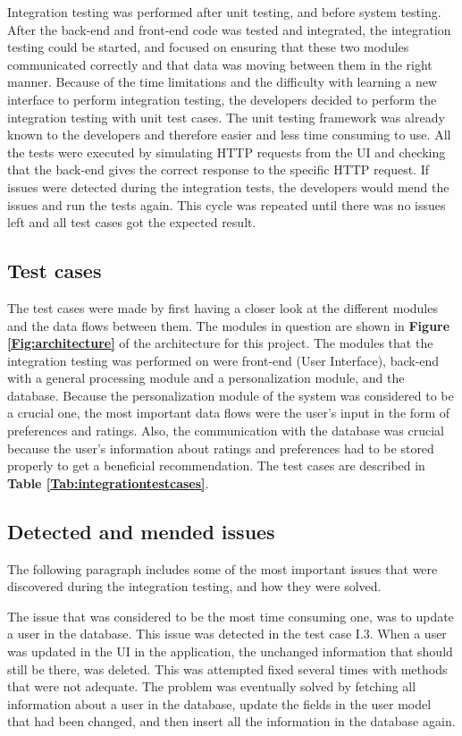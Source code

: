 Integration testing was performed after unit testing, and before system testing. After the back-end and front-end code was tested and integrated, the integration testing could be started, and focused on ensuring that these two modules communicated correctly and that data was moving between them in the right manner. 
Because of the time limitations and the difficulty with learning a new interface to perform integration testing, the developers decided to perform the integration testing with unit test cases. The unit testing framework was already known to the developers and therefore easier and less time consuming to use. All the tests were executed by simulating HTTP requests from the UI and checking that the back-end gives the correct response to the specific HTTP request. 
If issues were detected during the integration tests, the developers would mend the issues and run the tests again. This cycle was repeated until there was no issues left and all test cases got the expected result. \newline


\subsection{Test cases}
The test cases were made by first having a closer look at the different modules and the data flows between them. The modules in question are shown in \textbf{Figure \ref{Fig:architecture}} of the architecture for this project. The modules that the integration testing was performed on were front-end (User Interface), back-end with a general processing module and a personalization module, and the database. Because the personalization module of the system was considered to be a crucial one, the most important data flows were the user's input in the form of preferences and ratings. Also, the communication with the database was crucial because the user's information about ratings and preferences had to be stored properly to get a beneficial recommendation. The test cases are described in \textbf{Table \ref{Tab:integrationtestcases}}.


\subsection{Detected and mended issues}

The following paragraph includes some of the most important issues that were discovered during the integration testing, and how they were solved.

The issue that was considered to be the most time consuming one, was to update a user in the database. This issue was detected in the test case I.3. When a user was updated in the UI in the application, the unchanged information that should still be there, was deleted. This was attempted fixed several times with methods that were not adequate. The problem was eventually solved by fetching all information about a user in the database, update the fields in the user model that had been changed, and then insert all the information in the database again. \newline

